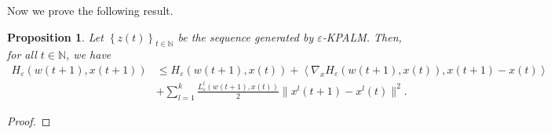 \documentclass[11pt]{article}
\numberwithin{equation}{section}
\newtheorem{proposition}{Proposition}[section]
\begin{document}
Now we prove the following result.

\begin{proposition} \label{State_H_eps_prop}
Let $\left\lbrace z(t) \right\rbrace_{t \in \mathbb{N}}$ be the sequence generated by $\varepsilon$-KPALM. Then, for all $t \in \mathbb{N}$, we have
\begin{align*}
	H_{\varepsilon}(w(t+1),x(t+1)) 
	&\leq H_{\varepsilon}(w(t+1),x(t)) + \left\langle \nabla_x H_{\varepsilon}(w(t+1),x(t)), x(t+1)-x(t) \right\rangle \\
	&+ \sum\limits_{l=1}^{k} \frac{L^l_{\varepsilon}(w(t+1),x(t))}{2} \|x^l(t+1)-x^l(t)\|^2 .
\end{align*}
\end{proposition}

\begin{proof}

\end{proof}
\end{document}
